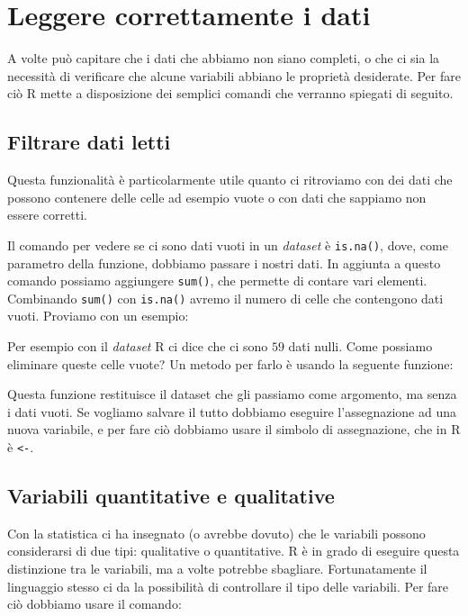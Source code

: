 \chapter{Leggere correttamente i dati}

A volte può capitare che i dati che abbiamo non siano completi, o che ci sia la
necessità di verificare che alcune variabili abbiano le proprietà desiderate.
Per fare ciò R mette a disposizione dei semplici comandi che verranno spiegati
di seguito.

\section{Filtrare dati letti}

Questa funzionalità è particolarmente utile quanto ci ritroviamo con dei dati
che possono contenere delle celle ad esempio vuote o con dati che sappiamo non
essere corretti.

Il comando per vedere se ci sono dati vuoti in un \textit{dataset} è
\texttt{is.na()}, dove, come parametro della funzione, dobbiamo passare i
nostri dati. In aggiunta a questo comando possiamo aggiungere \texttt{sum()},
che permette di contare vari elementi. Combinando \texttt{sum()} con
\texttt{is.na()} avremo il numero di celle che contengono dati vuoti.
Proviamo con un esempio:



Per esempio con il \textit{dataset} R ci dice che ci sono $59$ dati nulli.
Come possiamo eliminare queste celle vuote? Un metodo per farlo è usando la
seguente funzione:



Questa funzione restituisce il dataset che gli passiamo come argomento, ma
senza i dati vuoti. Se vogliamo salvare il tutto dobbiamo eseguire
l'assegnazione ad una nuova variabile, e per fare ciò dobbiamo usare il simbolo
di assegnazione, che in R è \texttt{<-}.

\section{Variabili quantitative e qualitative}

Con la statistica ci ha insegnato (o avrebbe dovuto) che le variabili possono
considerarsi di due tipi: qualitative o quantitative. R è in grado di eseguire
questa distinzione tra le variabili, ma a volte potrebbe sbagliare.
Fortunatamente il linguaggio stesso ci da la possibilità di controllare il tipo
delle variabili. Per fare ciò dobbiamo usare il comando:


